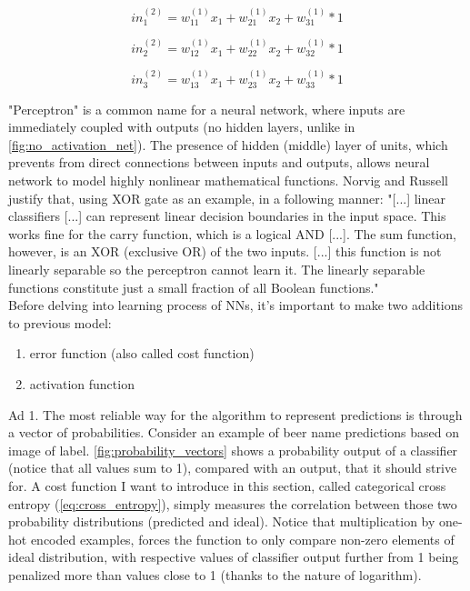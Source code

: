 \documentclass[11pt]{article}
\begin{document}
\begin{equation} \label{eq:in_1}
in_1^{(2)} = w_{11}^{(1)}x_1 + w_{21}^{(1)}x_2 + w_{31}^{(1)} * 1 
\end{equation}

\begin{equation} \label{eq:in_2}
in_2^{(2)} = w_{12}^{(1)}x_1 + w_{22}^{(1)}x_2 + w_{32}^{(1)} * 1 
\end{equation}

\begin{equation} \label{eq:in_3}
in_3^{(2)} = w_{13}^{(1)}x_1 + w_{23}^{(1)}x_2 + w_{33}^{(1)} * 1 
\end{equation}

"Perceptron" is a common name for a neural network, where inputs are immediately coupled with outputs (no hidden layers, unlike in \autoref{fig:no_activation_net}). The presence of hidden (middle) layer of units, which prevents from direct connections between inputs and outputs, allows neural network to model highly nonlinear mathematical functions. Norvig and Russell justify that, using XOR gate as an example, in a following manner: "[...] linear classifiers [...] can represent linear decision boundaries in the input space. This works fine for the carry function, which is a logical AND [...]. The sum function, however, is an XOR (exclusive OR) of the two inputs. [...] this function is not linearly separable so the perceptron cannot learn it. The linearly separable functions constitute just a small fraction of all Boolean functions." \cite{ai_modern_approach}\\

Before delving into learning process of NNs, it's important to make two additions to previous model:
\begin{enumerate}[1)]
\item error function (also called cost function)
\item activation function
\end{enumerate}
Ad 1. The most reliable way for the algorithm to represent predictions is through a vector of probabilities. Consider an example of beer name predictions based on image of label. \autoref{fig:probability_vectors} shows a probability output of a classifier (notice that all values sum to 1), compared with an output, that it should strive for. A cost function I want to introduce in this section, called categorical cross entropy (\autoref{eq:cross_entropy}), simply measures the correlation between those two probability distributions (predicted and ideal). Notice that multiplication by one-hot encoded examples, forces the function to only compare non-zero elements of ideal distribution, with respective values of classifier output further from 1 being penalized more than values close to 1 (thanks to the nature of logarithm).\\ 
\end{document}
